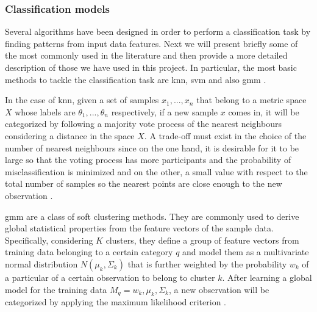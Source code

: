 	
\subsubsection{Classification models}
	
	Several algorithms have been designed in order to perform a classification task by finding patterns from input data features. Next we will present briefly some of the most commonly used in the literature and then provide a more detailed description of those we have used in this project. In particular, the most basic methods to tackle the classification task are \acrshort{knn}, \acrshort{svm} and also \acrshort{gmm} \cite{Fu2011}.
	
	In the case of \acrfull{knn}, given a set of samples ${x_1, ..., x_n}$ that belong to a metric space $X$ whose labels are ${\theta_1, ..., \theta_n}$ respectively, if a new sample $x$ comes in, it will be categorized by following a majority vote process of the nearest neighbours considering a distance in the space $X$. A trade-off must exist in the choice of the number of nearest neighbours since on the one hand, it is desirable for it to be large so that the voting process has more participants and  the probability of misclassification is minimized and on the other, a small value with respect to the total number of samples so the nearest points are close enough to the new observation \cite{Cover1967}. 
	
	 \acrfull{gmm} are a class of soft clustering methods. They are commonly used to derive global statistical properties from the feature vectors of the sample data. Specifically, considering $K$ clusters, they define a group of feature vectors from training data belonging to a certain category $q$ and model them as a multivariate normal distribution $N(\mu_k, \Sigma_k)$ that is further weighted by the probability $w_k$ of a particular of a certain observation to belong to cluster $k$. After learning a global model for the training data $M_q={w_k, \mu_k, \Sigma_k}$, a new observation will be categorized by applying the maximum likelihood criterion \cite{Stowell2015}. 
	
